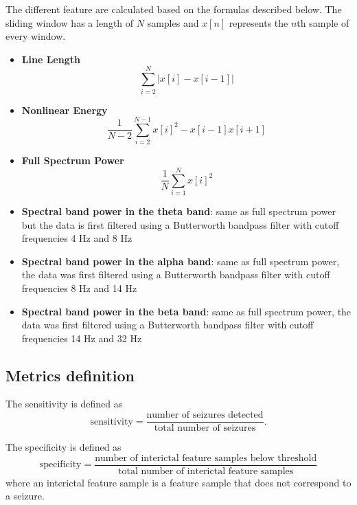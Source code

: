 \documentclass[usletter, 11pt]{extarticle}
\begin{document}
The different feature are calculated based on the formulas described below. The sliding window has a length of $N$ samples and $x[n]$ represents the $n$th sample of every window.
\begin{itemize}
	\item \textbf{Line Length} $$ \sum_{i=2}^N \Big|x[i] - x[i-1]\Big|$$
	\item \textbf{Nonlinear Energy} $$\frac{1}{N-2} \sum_{i=2}^{N-1} x[i]^2 - x[i-1]x[i+1]$$
	\item \textbf{Full Spectrum Power} $$\frac{1}{N} \sum_{i=1}^N x[i]^2$$
	\item \textbf{Spectral band power in the theta band}: same as full spectrum power but the data is first filtered using a Butterworth bandpass filter with cutoff frequencies 4 Hz and 8 Hz
	\item \textbf{Spectral band power in the alpha band}: same as full spectrum power, the data was first filtered using a Butterworth bandpass filter with cutoff  frequencies 8 Hz and 14 Hz
	\item \textbf{Spectral band power in the beta band}: same as full spectrum power, the data was first filtered using a Butterworth bandpass filter with cutoff  frequencies 14 Hz and 32 Hz \\
\end{itemize}

\subsection{Metrics definition} \label{sec:metrics}

The sensitivity is defined as 
$$\text{sensitivity} = \frac{\text{number of seizures detected}}{\text{total number of seizures}}.$$

The specificity is defined as
$$\text{specificity} = \frac{\text{number of interictal feature samples below threshold}}{\text{total number of interictal feature samples}}$$ where an interictal feature sample is a feature sample that does not correspond to a seizure.

\end{document}
